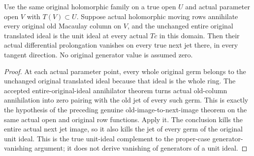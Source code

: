 \begin{theorem}
\label{hir:actual-dual-jet-prolongation-original-unit-ideal-zero}
\leanok
Use the same original holomorphic family on a true open $U$ and
actual parameter open $V$ with $T(V)\subset U$. Suppose actual
holomorphic moving rows annihilate every original old Macaulay column
on $V$, and the unchanged entire original translated ideal is the
unit ideal at every actual $Tc$ in this domain. Then their actual
differential prolongation vanishes on every true next jet there, in
every tangent direction. No original generator value is assumed zero.
\end{theorem}
\begin{proof}
At each actual parameter point, every whole original germ belongs to
the unchanged original translated ideal because that ideal is the
whole ring. The accepted entire-original-ideal annihilator theorem
turns actual old-column annihilation into zero pairing with the old
jet of every such germ. This is exactly the hypothesis of the
preceding genuine old-image-to-next-image theorem on the same actual
open and original row functions. Apply it. The conclusion kills the
entire actual next jet image, so it also kills the jet of every germ
of the original unit ideal. This is the true unit-ideal complement
to the proper-case generator-vanishing argument; it does not derive
vanishing of generators of a unit ideal.
\end{proof}

